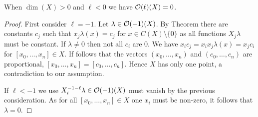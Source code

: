 \documentclass[a4paper,parskip=half,numbers=enddot, DIV=12]{scrreprt}
\begin{document}
\begin{cor}
    When $\dim(X) >0$ and $\ell<0$ we have $\mathcal{O}(\ell)(X) = 0$.
\end{cor}
\begin{proof}
    First consider $\ell=-1$. Let $\lambda\in \mathcal{O}(-1)(X)$. By Theorem  there are constants $c_j$ such that $x_j \lambda(x) = c_j$ for $x\in C(X)\setminus\{0\}$ as all functions $X_j\lambda$ must be constant. If $\lambda\neq 0$ then not all $c_i$ are $0$. We have $x_ic_j = x_ix_j\lambda(x) = x_jc_i$ for $[x_0,\ldots, x_n]\in X$. If follows that the vectors $(x_0,\ldots, x_n)$ and $(c_0,\ldots, c_n)$ are proportional, $[x_0,\ldots, x_n] = [c_0,\ldots, c_n]$. Hence $X$ has only one point, a contradiction to our assumption. 
    
    If $\ell<-1$ we use $X_i^{-1-\ell}\lambda\in \mathcal{O}(-1)(X)$ must vanish by the previous consideration. As for all $[x_0,\ldots,x_n]\in X$ one $x_i$ must be non-zero, it follows that $\lambda = 0$.
\end{proof}
\end{document}

